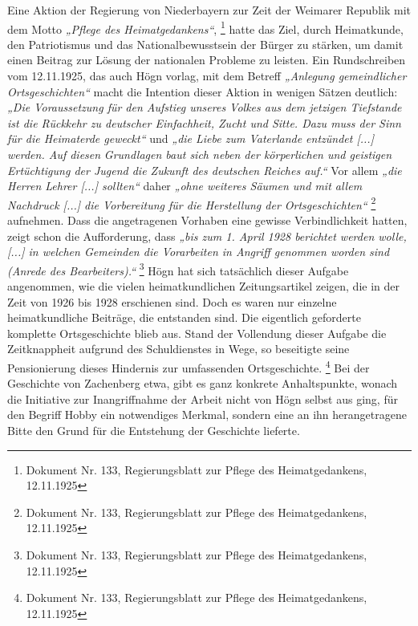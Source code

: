 \documentclass[a4paper]{article}
\newcommand\textstyleZitate[1]{\textit{#1}}
\begin{document}
Eine Aktion der Regierung von Niederbayern zur Zeit der Weimarer
Republik mit dem Motto \textstyleZitate{„Pflege des
Heimatgedankens“}, \footnote{Dokument Nr. 133, Regierungsblatt zur
Pflege des Heimatgedankens, 12.11.1925} hatte das Ziel, durch
Heimatkunde, den Patriotismus und das Nationalbewusstsein der Bürger zu
stärken, um damit einen Beitrag zur Lösung der nationalen Probleme zu
leisten. Ein Rundschreiben vom 12.11.1925, das auch Högn vorlag, mit
dem Betreff \textstyleZitate{„Anlegung gemeindlicher Ortsgeschichten“}
macht die Intention dieser Aktion in wenigen Sätzen deutlich:
\textstyleZitate{„Die Voraussetzung für den Aufstieg unseres Volkes aus
dem jetzigen Tiefstande ist die Rückkehr zu deutscher Einfachheit,
Zucht und Sitte. Dazu muss der Sinn für die Heimaterde geweckt“} und
\textstyleZitate{„die Liebe zum Vaterlande entzündet [...] werden. Auf
diesen }\textstyleZitate{Grundlagen baut sich neben der körperlichen
und geistigen Ertüchtigung der Jugend die Zukunft des deutschen Reiches
auf.“} Vor allem \textstyleZitate{„die Herren Lehrer [...] sollten“
}daher\textstyleZitate{ „ohne weiteres Säumen und mit allem Nachdruck
[...] die Vorbereitung für die Herstellung der
Ortsgeschichten“} \footnote{Dokument Nr. 133, Regierungsblatt zur
Pflege des Heimatgedankens, 12.11.1925} aufnehmen. Dass die
angetragenen Vorhaben eine gewisse Verbindlichkeit hatten, zeigt schon
die Aufforderung, dass \textstyleZitate{„bis zum 1. April 1928
berichtet werden wolle, [...] in welchen Gemeinden die Vorarbeiten in
Angriff genommen worden sind (Anrede des Bearbeiters).“ }\footnote{
Dokument Nr. 133, Regierungsblatt zur Pflege des Heimatgedankens,
12.11.1925} Högn hat sich tatsächlich dieser Aufgabe angenommen, wie
die vielen heimatkundlichen Zeitungsartikel zeigen, die in der Zeit von
1926 bis 1928 erschienen sind. Doch es waren nur einzelne
heimatkundliche Beiträge, die entstanden sind. Die eigentlich
geforderte komplette Ortsgeschichte blieb aus. Stand der Vollendung
dieser Aufgabe die Zeitknappheit aufgrund des Schuldienstes in Wege, so
beseitigte seine Pensionierung dieses Hindernis zur umfassenden
Ortsgeschichte. \footnote{Dokument Nr. 133, Regierungsblatt zur Pflege
des Heimatgedankens, 12.11.1925} Bei der Geschichte von Zachenberg
etwa, gibt es ganz konkrete Anhaltspunkte, wonach die Initiative zur
Inangriffnahme der Arbeit nicht von Högn selbst aus ging, für den
Begriff Hobby ein notwendiges Merkmal, sondern eine an ihn
herangetragene Bitte den Grund für die Entstehung der Geschichte
lieferte.
\end{document}
